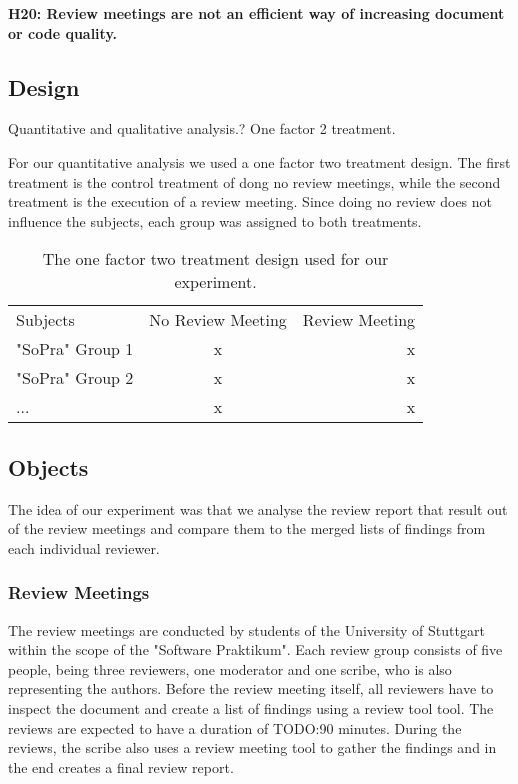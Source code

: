 \textbf{H20: Review meetings are not an efficient way of increasing document or code quality.}

\subsection{Design}

Quantitative and qualitative analysis.?
One factor 2 treatment.

For our quantitative analysis we used a one factor two treatment design. The first treatment is the control treatment of dong no review meetings, while the second treatment is the execution of a review meeting. Since doing no review does not influence the subjects, each group was assigned to both treatments.


\begin{table}
\centering
\begin{tabular}{lcr}
  \rowcolor{heading}Subjects & No Review Meeting & Review Meeting \\
  \rowcolor{a}"SoPra" Group 1 & x & x \\
  \rowcolor{b}"SoPra" Group 2 & x & x \\
  \rowcolor{a}... & x & x \\
\end{tabular}
\caption{The one factor two treatment design used for our experiment.}
\end{table}


\subsection{Objects}

The idea of our experiment was that we analyse the review report that result out of the review meetings and compare them to the merged lists of findings from each individual reviewer.

\subsubsection{Review Meetings}

The review meetings are conducted by students of the University of Stuttgart within the scope of the "Software Praktikum". Each review group consists of five people, being three reviewers, one moderator and one scribe, who is also representing the authors. Before the review meeting itself, all reviewers have to inspect the document and create a list of findings using a review tool \cite{TODO:revager Thommy} tool. The reviews are expected to have a duration of TODO:90 minutes. During the reviews, the scribe also uses a review meeting tool to gather the findings and in the end creates a final review report.

